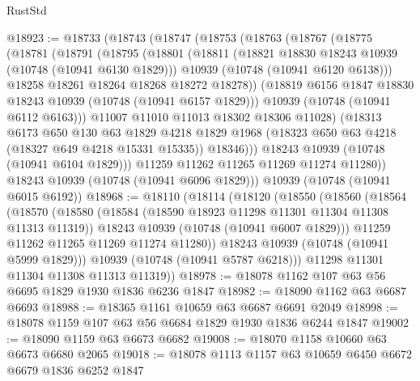 \begin{lexlean}{RustStd}
\begin{coremodule}
@18923 := @18733
    (@18743
      (@18747
        (@18753
          (@18763
            (@18767
              (@18775
                (@18781
                  (@18791
                    (@18795
                      (@18801
                        (@18811
                          (@18821 @18830 @18243 @10939 (@10748 (@10941 @6130 @1829)))
                          @10939
                          (@10748 (@10941 @6120 @6138)))
                        @18258
                        @18261
                        @18264
                        @18268
                        @18272
                        @18278))
                    (@18819 @6156 @1847 @18830 @18243 @10939 (@10748 (@10941 @6157 @1829)))
                    @10939
                    (@10748 (@10941 @6112 @6163)))
                  @11007
                  @11010
                  @11013
                  @18302
                  @18306
                  @11028)
                (@18313
                  @6173
                  @650
                  @130
                  @63
                  @1829
                  @4218
                  @1829
                  @1968
                  (@18323 @650 @63 @4218 (@18327 @649 @4218 @15331 @15335))
                  @18346)))
            @18243
            @10939
            (@10748 (@10941 @6104 @1829)))
          @11259
          @11262
          @11265
          @11269
          @11274
          @11280))
      @18243
      @10939
      (@10748 (@10941 @6096 @1829)))
    @10939
    (@10748 (@10941 @6015 @6192))
@18968 := @18110
    (@18114
      (@18120
        (@18550
          (@18560
            (@18564
              (@18570
                (@18580
                  (@18584 (@18590 @18923 @11298 @11301 @11304 @11308 @11313 @11319))
                  @18243
                  @10939
                  (@10748 (@10941 @6007 @1829)))
                @11259
                @11262
                @11265
                @11269
                @11274
                @11280))
            @18243
            @10939
            (@10748 (@10941 @5999 @1829)))
          @10939
          (@10748 (@10941 @5787 @6218)))
        @11298
        @11301
        @11304
        @11308
        @11313
        @11319))
@18978 := @18078 @1162 @107 @63 @56 @6695 @1829 @1930 @1836 @6236 @1847
@18982 := @18090 @1162 @63 @6687 @6693
@18988 := @18365 @1161 @10659 @63 @6687 @6691 @2049
@18998 := @18078 @1159 @107 @63 @56 @6684 @1829 @1930 @1836 @6244 @1847
@19002 := @18090 @1159 @63 @6673 @6682
@19008 := @18070 @1158 @10660 @63 @6673 @6680 @2065
@19018 := @18078 @1113 @1157 @63 @10659 @6450 @6672 @6679 @1836 @6252 @1847

\end{coremodule}
\end{lexlean}
